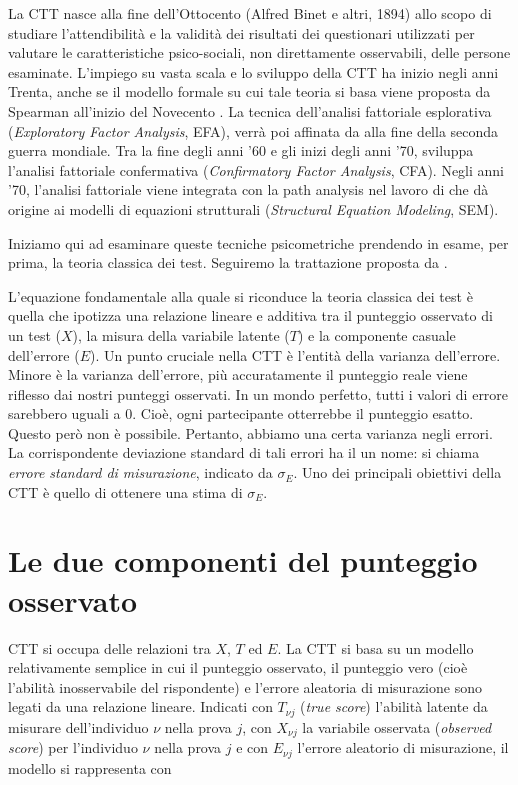 \documentclass[
  11pt,
]{krantz}
\theoremstyle{definition}
\theoremstyle{definition}
\theoremstyle{definition}
\theoremstyle{definition}
\theoremstyle{remark}
\begin{document}
La CTT nasce alla fine dell'Ottocento (Alfred Binet e altri, 1894) allo scopo di studiare l'attendibilità e la validità dei risultati dei questionari utilizzati per valutare le caratteristiche psico-sociali, non direttamente osservabili, delle persone esaminate. L'impiego su vasta scala e lo sviluppo della CTT ha inizio negli anni Trenta, anche se il modello formale su cui tale teoria si basa viene proposta da Spearman all'inizio del Novecento \citep{ch1904general}. La tecnica dell'analisi fattoriale esplorativa (\emph{Exploratory Factor Analysis}, EFA), verrà poi affinata da \citet{thurstone1947multiple} alla fine della seconda guerra mondiale. Tra la fine degli anni '60 e gli inizi degli anni '70, \citet{joreskog1969general} sviluppa l'analisi fattoriale confermativa (\emph{Confirmatory Factor Analysis}, CFA). Negli anni '70, l'analisi fattoriale viene integrata con la path analysis nel lavoro di \citet{joreskog1978structural} che dà origine ai modelli di equazioni strutturali (\emph{Structural Equation Modeling}, SEM).

Iniziamo qui ad esaminare queste tecniche psicometriche prendendo in esame, per prima, la teoria classica dei test. Seguiremo la trattazione proposta da \citet{lord1968statistical}.

L'equazione fondamentale alla quale si riconduce la teoria classica dei test è quella che ipotizza una relazione lineare e additiva tra il punteggio osservato di un test (\(X\)), la misura della variabile latente (\(T\)) e la componente casuale dell'errore (\(E\)). Un punto cruciale nella CTT è l'entità della varianza dell'errore. Minore è la varianza dell'errore, più accuratamente il punteggio reale viene riflesso dai nostri punteggi osservati. In un mondo perfetto, tutti i valori di errore sarebbero uguali a 0. Cioè, ogni partecipante otterrebbe il punteggio esatto. Questo però non è possibile. Pertanto, abbiamo una certa varianza negli errori. La corrispondente deviazione standard di tali errori ha il un nome: si chiama \emph{errore standard di misurazione}, indicato da \(\sigma_E\). Uno dei principali obiettivi della CTT è quello di ottenere una stima di \(\sigma_E\).

\hypertarget{le-due-componenti-del-punteggio-osservato}{%
\section{Le due componenti del punteggio osservato}\label{le-due-componenti-del-punteggio-osservato}}

CTT si occupa delle relazioni tra \(X\), \(T\) ed \(E\). La CTT si basa su un modello relativamente semplice in cui il punteggio osservato, il punteggio vero (cioè l'abilità inosservabile del rispondente) e l'errore aleatoria di misurazione sono legati da una relazione lineare. Indicati con \(T_{\nu j}\) (\emph{true score}) l'abilità latente da misurare dell'individuo \(\nu\) nella prova \(j\), con \(X_{\nu j}\) la variabile osservata (\emph{observed score}) per l'individuo \(\nu\) nella prova \(j\) e con \(E_{\nu j}\) l'errore aleatorio di misurazione, il modello si rappresenta con
\end{document}
